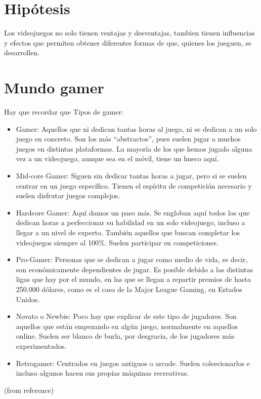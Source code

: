 \documentclass{bmcart}
\begin{document}
\section*{Hipótesis}
Los videojuegos no solo tienen ventajas y desventajas, tambien tienen influencias y efectos que permiten obtener diferentes formas de que, quienes los jueguen, se desarrollen. %

\section*{Mundo gamer}
Hay que recordar que \cite{rating}
\newline
Tipos de gamer:
\begin{itemize} 
	\item Gamer: Aquellos que ni dedican tantas horas al juego, ni se dedican a un solo juego en concreto. Son los más “abstractos”, pues suelen jugar a muchos juegos en distintas plataformas. La mayoría de los que hemos jugado alguna vez a un videojuego, aunque sea en el móvil, tiene un hueco aquí.
	\item Mid-core Gamer: Siguen sin dedicar tantas horas a jugar, pero si se suelen centrar en un juego específico. Tienen el espíritu de competición necesario y suelen disfrutar juegos complejos.
	\item Hardcore Gamer: Aquí damos un paso más. Se engloban aquí todos los que dedican horas a perfeccionar su habilidad en un solo videojuego, incluso a llegar a un nivel de experto. También aquellos que buscan completar los videojuegos siempre al 100{\%}. Suelen participar en competiciones.
	\item Pro-Gamer: Personas que se dedican a jugar como medio de vida, es decir, son económicamente dependientes de jugar. Es posible debido a las distintas ligas que hay por el mundo, en las que se llegan a repartir premios de hasta 250.000 dólares, como es el caso de la Major League Gaming, en Estados Unidos.
	\item Novato o Newbie: Poco hay que explicar de este tipo de jugadores. Son aquellos que están empezando en algún juego, normalmente en aquellos online. Suelen ser blanco de burla, por desgracia, de los jugadores más experimentados.
	\item Retrogamer: Centrados en juegos antiguos o arcade. Suelen coleecionarlos e incluso algunos hacen sus propias máquinas recreativas.
\end{itemize} (from reference\cite{tiposgamer})
\end{document}
